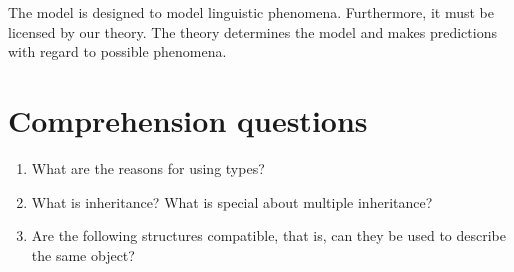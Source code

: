 \nocite{Netter98a}%
%
%
%
The model is designed to model linguistic phenomena. Furthermore, it must be licensed by our theory.
The theory determines the model and makes predictions with regard to possible phenomena.


\section*{Comprehension questions}

\begin{enumerate}
\item What are the reasons for using types?
\item What is inheritance? What is special about multiple inheritance?
\item Are the following structures compatible, that is, can they be used to describe the same object? 
\ea
{}\hspace{0.5cm}
\z
\ea
{}\hspace{0.5cm}
\z

\end{enumerate}


